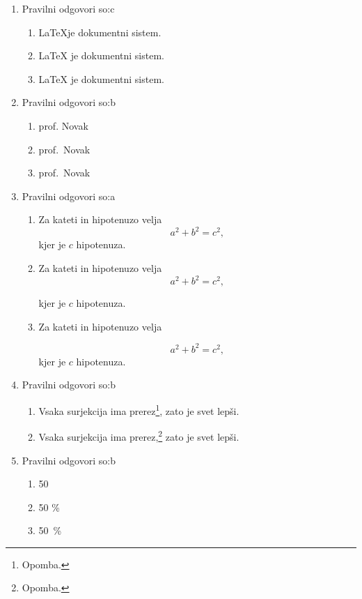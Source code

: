 \documentclass[11pt]{article}
\begin{document}
\begin{enumerate}
    \item Pravilni odgovori so:c %
    \begin{enumerate}
        \item \LaTeX je dokumentni sistem.
        \item {\LaTeX} je dokumentni sistem.
        \item \LaTeX{} je dokumentni sistem.
    \end{enumerate}

    \item Pravilni odgovori so:b %
    \begin{enumerate}
        \item prof. Novak
        \item prof.~Novak
        \item prof.\ Novak
    \end{enumerate}

    \item Pravilni odgovori so:a %
    \begin{enumerate}
        \item
Za kateti in hipotenuzo velja
\[
  a^2 + b^2 = c^2,
\]
kjer je \(c\) hipotenuza.
        \item
Za kateti in hipotenuzo velja
\[
  a^2 + b^2 = c^2,
\]

kjer je \(c\) hipotenuza.
        \item
Za kateti in hipotenuzo velja

\[
  a^2 + b^2 = c^2,
\]
kjer je \(c\) hipotenuza.
    \end{enumerate}

    \item Pravilni odgovori so:b %
    \begin{enumerate}
        \item Vsaka surjekcija ima prerez\footnote{Opomba.}, zato je svet lepši.
        \item Vsaka surjekcija ima prerez,\footnote{Opomba.} zato je svet lepši.
    \end{enumerate}

    \item Pravilni odgovori so:b %
    \begin{enumerate}
        \item 50 %
        \item 50 \%
        \item 50~\%
    \end{enumerate}


\end{enumerate}
\end{document}

